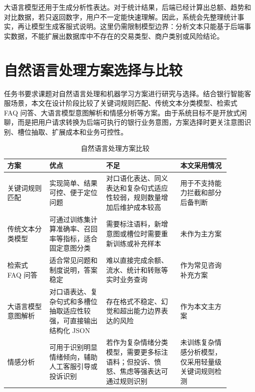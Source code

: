 \documentclass[bachelor, print]{xduthesis}
\begin{document}
大语言模型还用于生成分析性表达。对于统计结果，后端已经计算出总额、趋势和对比数据，若只返回数字，用户不一定能快速理解。因此，系统会先整理统计事实，再让模型生成客服式说明。这里仍需限制模型边界：分析文本只能基于后端事实数据，不能扩展出数据库中不存在的交易类型、商户类别或风险结论。

\section{自然语言处理方案选择与比较}

任务书要求课题对自然语言处理和机器学习方案进行研究与选择。结合银行智能客服场景，本文在设计阶段比较了关键词规则匹配、传统文本分类模型、检索式 FAQ 问答、大语言模型意图解析和情感分析等方案。由于系统目标不是开放式闲聊，而是把用户请求转换为后端可执行的银行业务意图，方案选择时更关注意图识别、槽位抽取、扩展成本和业务可控性。

\begin{table}[H]
    \centering
    \caption{自然语言处理方案比较}
    \label{tab:nlp-solution-compare}
    \small
    \setlength{\tabcolsep}{3pt}
    \begin{tabular}{|p{0.17\linewidth}|p{0.23\linewidth}|p{0.3\linewidth}|p{0.2\linewidth}|}
        \hline
        方案 & 优点 & 不足 & 本文采用情况 \\
        \hline
        关键词规则匹配 & 实现简单、结果可控、便于定位问题 & 对口语化表达、同义表达和复杂句式适应性较弱，规则数量增加后维护成本较高 & 用于不支持能力拦截和部分后备判断 \\
        \hline
        传统文本分类模型 & 可通过训练集计算准确率、召回率等指标，适合固定意图分类 & 需要标注语料，新增意图或槽位时需要重新训练或补充样本 & 未作为主方案 \\
        \hline
        检索式 FAQ 问答 & 适合常见问题和制度说明，答案稳定 & 难以直接完成余额、流水、统计和转账等实时业务查询 & 作为常见咨询补充方案 \\
        \hline
        大语言模型意图解析 & 对口语表达、复杂句式和多槽位抽取适应性较强，可直接输出结构化 JSON & 存在格式不稳定、幻觉和超出能力边界表达的风险 & 作为本文主方案 \\
        \hline
        情感分析 & 可用于识别明显情绪倾向，辅助人工客服引导或投诉识别 & 若作为复杂情绪分类模型，需要更多标注语料；但投诉、愤怒、焦虑等强表达可通过规则识别 & 未训练复杂情感分析模型，仅采用轻量级关键词规则检测 \\
        \hline
    \end{tabular}
\end{table}
\end{document}
